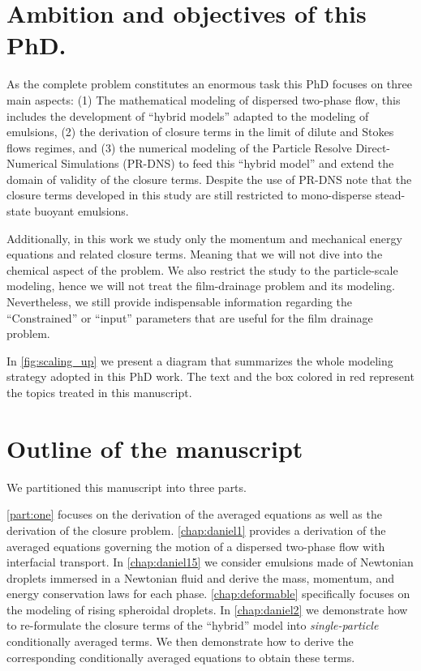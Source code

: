 \section{Ambition and objectives of this PhD.}




As the complete problem constitutes an enormous task this PhD focuses on three main aspects: 
(1) The mathematical modeling of dispersed two-phase flow, this includes the development of ``hybrid models'' adapted to the modeling of emulsions, 
(2) the derivation of closure terms in the limit of dilute and Stokes flows regimes,  
and (3) the numerical modeling of the Particle Resolve Direct-Numerical Simulations (PR-DNS) to feed this ``hybrid model'' and extend the domain of validity of the closure terms. 
Despite the use of PR-DNS note that the closure terms developed in this study are still restricted to mono-disperse stead-state buoyant emulsions. 

Additionally, in this work we study only the momentum and mechanical energy equations and related closure terms. 
Meaning that we will not dive into the chemical aspect of the problem. %
We also restrict the study to the particle-scale modeling, hence we will not treat the film-drainage problem and its modeling.   
Nevertheless, we still provide indispensable information regarding the ``Constrained'' or ``input'' parameters that are useful for the film drainage problem. 

In \ref{fig:scaling_up} we present a diagram that summarizes the whole modeling strategy adopted in this PhD work. 
The text and the box colored in red represent the topics treated in this manuscript. 


\section{Outline of the manuscript}


We partitioned this manuscript into three parts. 

\ref{part:one} focuses on the derivation of the averaged equations as well as the derivation of the closure problem. 
\ref{chap:daniel1} provides a derivation of the averaged equations governing the motion of a dispersed two-phase flow with interfacial transport. 
In \ref{chap:daniel15} we consider emulsions made of Newtonian droplets immersed in a Newtonian fluid and derive the mass, momentum, and energy conservation laws for each phase. 
\ref{chap:deformable} specifically focuses on the modeling of rising spheroidal droplets. 
In \ref{chap:daniel2} we demonstrate how to re-formulate the closure terms of the ``hybrid'' model into \textit{single-particle} conditionally averaged terms. 
We then demonstrate how to derive the corresponding conditionally averaged equations to obtain these terms. 



